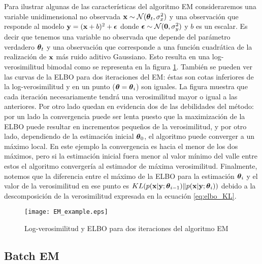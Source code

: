 Para ilustrar algunas de las características del algoritmo EM consideraremos una variable unidimensional no observada $\mathbf{x} \sim \mathcal{N}(\mbox{\boldmath$ \theta $}_t, \sigma_x^2)$ y una observación que responde al modelo $\mathbf{y} = (\mathbf{x} + b)^2 + \mbox{\boldmath$ \epsilon $}$ donde $\mbox{\boldmath$ \epsilon $} \sim \mathcal{N}(\mathbf{0}, \sigma_y^2)$ y $b$ es un escalar. Es decir que tenemos una variable no observada que depende del parámetro verdadero $\mbox{\boldmath$ \theta $}_t$ y una observación que corresponde a una función cuadrática de la realización de $\mathbf{x}$ más ruido aditivo Gaussiano. Esto resulta en una log-verosimilitud bimodal como se representa en la figura \ref{fig:EM_example}. También se pueden ver las curvas de la ELBO para dos iteraciones del EM: éstas son cotas inferiores de la log-verosimilitud y en un punto ($\mbox{\boldmath$ \theta $} = \mbox{\boldmath$ \theta $}_i$) son iguales. La figura muestra que cada iteración necesariamente tendrá una verosimilitud mayor o igual a las anteriores. Por otro lado quedan en evidencia dos de las debilidades del método: por un lado la convergencia puede ser lenta  puesto que la maximización de la ELBO puede resultar en incrementos pequeños de la verosimilitud, y por otro lado, dependiendo de la estimación inicial $\mbox{\boldmath$ \theta $}_0$, el algoritmo puede converger a un máximo local. En este ejemplo la convergencia es hacia el menor de los dos máximos, pero si la estimación inicial fuera menor al valor mínimo del valle entre estos el algoritmo convergería al estimador de máxima verosimilitud. Finalmente, notemos que la diferencia entre el máximo de la ELBO para la estimación $\mbox{\boldmath$ \theta $}_i$ y el valor de la verosimilitud en ese punto es $KL(p(\mathbf{x} | \mathbf{y}; \mbox{\boldmath$ \theta $}_{i-1}) \rVert p(\mathbf{x} | \mathbf{y}; \mbox{\boldmath$ \theta $}_{i}))$ debido a la descomposición de la verosimilitud expresada en la ecuación \ref{eq:elbo_KL}.

\begin{figure}[h]
    \centering
    \texttt{[image: EM\_example.eps]}
    \caption{Log-verosimilitud y ELBO para dos iteraciones del algoritmo EM}
    \label{fig:EM_example}
\end{figure}

\subsection{Batch EM} \label{sec:batchEM}


